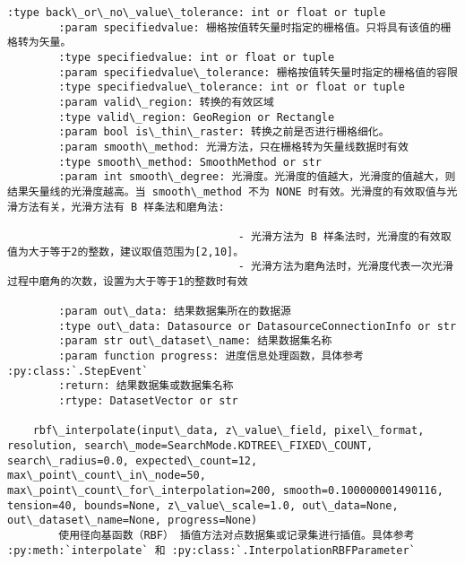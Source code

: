 \documentclass[11pt]{article}
\begin{document}
\begin{Verbatim}[commandchars=\\\{\}]
        :type back\_or\_no\_value\_tolerance: int or float or tuple
        :param specifiedvalue: 栅格按值转矢量时指定的栅格值。只将具有该值的栅格转为矢量。
        :type specifiedvalue: int or float or tuple
        :param specifiedvalue\_tolerance: 栅格按值转矢量时指定的栅格值的容限
        :type specifiedvalue\_tolerance: int or float or tuple
        :param valid\_region: 转换的有效区域
        :type valid\_region: GeoRegion or Rectangle
        :param bool is\_thin\_raster: 转换之前是否进行栅格细化。
        :param smooth\_method: 光滑方法，只在栅格转为矢量线数据时有效
        :type smooth\_method: SmoothMethod or str
        :param int smooth\_degree: 光滑度。光滑度的值越大，光滑度的值越大，则结果矢量线的光滑度越高。当 smooth\_method 不为 NONE 时有效。光滑度的有效取值与光滑方法有关，光滑方法有 B 样条法和磨角法:
        
                                    - 光滑方法为 B 样条法时，光滑度的有效取值为大于等于2的整数，建议取值范围为[2,10]。
                                    - 光滑方法为磨角法时，光滑度代表一次光滑过程中磨角的次数，设置为大于等于1的整数时有效
        
        :param out\_data: 结果数据集所在的数据源
        :type out\_data: Datasource or DatasourceConnectionInfo or str
        :param str out\_dataset\_name: 结果数据集名称
        :param function progress: 进度信息处理函数，具体参考 :py:class:`.StepEvent`
        :return: 结果数据集或数据集名称
        :rtype: DatasetVector or str
    
    rbf\_interpolate(input\_data, z\_value\_field, pixel\_format, resolution, search\_mode=SearchMode.KDTREE\_FIXED\_COUNT, search\_radius=0.0, expected\_count=12, max\_point\_count\_in\_node=50, max\_point\_count\_for\_interpolation=200, smooth=0.100000001490116, tension=40, bounds=None, z\_value\_scale=1.0, out\_data=None, out\_dataset\_name=None, progress=None)
        使用径向基函数（RBF） 插值方法对点数据集或记录集进行插值。具体参考 :py:meth:`interpolate` 和 :py:class:`.InterpolationRBFParameter`
        

\end{Verbatim}
\end{document}
